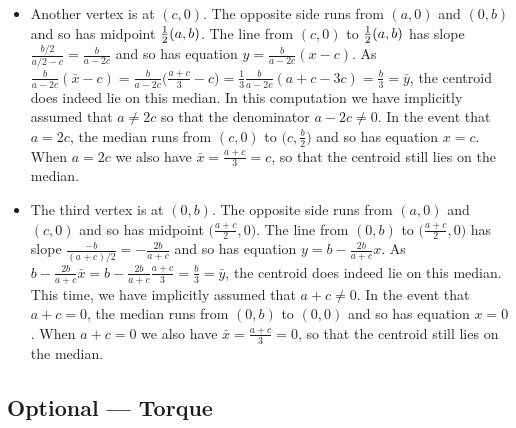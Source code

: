 \begin{eg}
\begin{itemize}
\item Another vertex is at $(c,0)$. The opposite side runs from
$(a,0)$ and $(0,b)$ and so has midpoint $\tfrac{1}{2}(a,b)$. The line
from $(c,0)$ to $\tfrac{1}{2}(a,b)$ has slope $\frac{b/2}{a/2-c}=\frac{b}{a-2c}$
and so has equation $y=\frac{b}{a-2c}(x-c)$. As
$\frac{b}{a-2c}(\bar x-c)
=\frac{b}{a-2c}\big(\frac{a+c}{3}-c\big)
=\frac{1}{3}\frac{b}{a-2c}(a+c-3c)
=\frac{b}{3}
=\bar y$, the centroid does indeed lie on this median.
In this computation we have implicitly assumed that $a\ne 2c$ so that
the denominator $a-2c\ne 0$. In the event that $a=2c$, the median runs from
$(c,0)$ to $\big(c,\frac{b}{2}\big)$ and so has equation $x=c$. When
$a=2c$ we also have $\bar x=\frac{a+c}{3}=c$, so that the centroid still
lies on the median.


\item The third vertex is at $(0,b)$. The opposite side runs from
$(a,0)$ and $(c,0)$ and so has midpoint $\big(\frac{a+c}{2},0\big)$.
The line from $(0,b)$ to $\big(\frac{a+c}{2},0\big)$ has slope
$\frac{-b}{(a+c)/2}=-\frac{2b}{a+c}$
and so has equation $y=b-\frac{2b}{a+c}x$. As
$b-\frac{2b}{a+c}\bar x
=b-\frac{2b}{a+c}\frac{a+c}{3}
=\frac{b}{3}
=\bar y$, the centroid does indeed lie on this median.
This time, we have implicitly assumed that $a+c\ne 0$.
In the event that $a+c=0$, the median runs from
$(0,b)$ to $(0,0)$ and so has equation $x=0$. When
$a+c=0$ we also have $\bar x=\frac{a+c}{3}=0$, so that the centroid still
lies on the median.
\end{itemize}


\end{eg}


\goodbreak
\subsection{Optional --- Torque}

